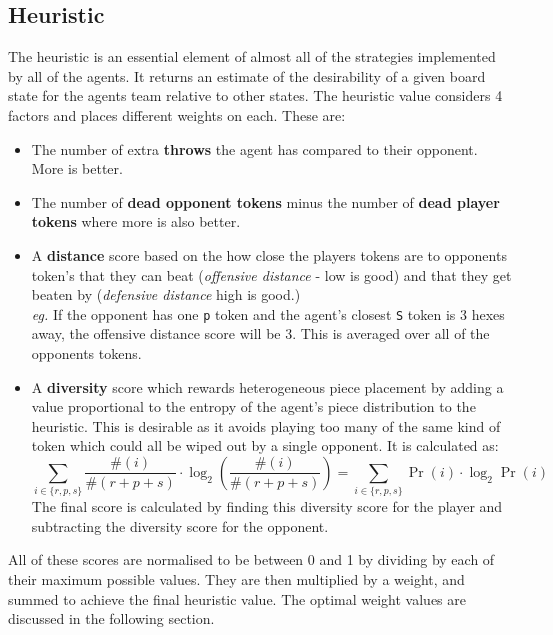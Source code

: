 \documentclass{article}
\begin{document}
\subsection{Heuristic}
\label{sec: Heuristic}
The heuristic is an essential element of almost all of the strategies implemented by all of the agents. It returns an estimate of the desirability of a given board state for the agents team relative to other states. The heuristic value considers 4 factors and places different weights on each. These are:
\begin{itemize}
    \item The number of extra \textbf{throws} the agent has compared to their opponent. More is better.
    \item The number of \textbf{dead opponent tokens} minus the number of \textbf{dead player tokens} where more is also better.
    \item A \textbf{distance} score based on the how close the players tokens are to opponents token's that they can beat (\textit{offensive distance} - low is good) and that they get beaten by (\textit{defensive distance} high is good.)\\[2mm]
    \textit{eg.} If the opponent has one \verb|p| token and the agent's closest \verb|S| token is 3 hexes away, the offensive distance score will be 3. This is averaged over all of the opponents tokens.
    \item A \textbf{diversity} score which rewards heterogeneous piece placement by adding a value proportional to the entropy of the agent's piece distribution to the heuristic. This is desirable as it avoids playing too many of the same kind of token which could all be wiped out by a single opponent. It is calculated as: $$\sum_{i\in\{r,p,s\}} \frac{\#(i)}{\#(r+p+s)} \cdot \log_2 \left( \frac{\#(i)}{\#(r+p+s)} \right) = \sum_{i\in\{r,p,s\}} \Pr(i) \cdot \log_2 \Pr(i)$$
    The final score is calculated by finding this diversity score for the player and subtracting the diversity score for the opponent.
\end{itemize}
All of these scores are normalised to be between 0 and 1 by dividing by each of their maximum possible values. They are then multiplied by a weight, and summed to achieve the final heuristic value. The optimal weight values are discussed in the following section.
\end{document}
